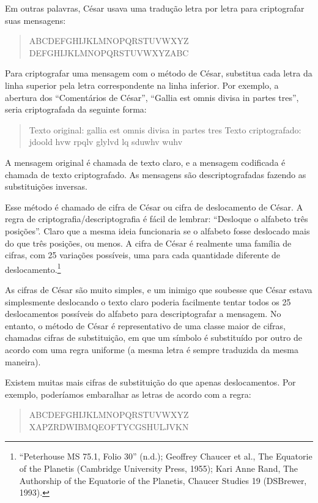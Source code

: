 \documentclass{book}
\begin{document}
Em outras palavras, César usava uma tradução letra por letra para criptografar suas mensagens:

\begin{quote}
    ABCDEFGHIJKLMNOPQRSTUVWXYZ
    DEFGHIJKLMNOPQRSTUVWXYZABC
\end{quote}

Para criptografar uma mensagem com o método de César, substitua cada letra da linha superior pela letra correspondente na linha inferior. Por exemplo, a abertura dos ``Comentários de César'', ``Gallia est omnis divisa in partes tres'', seria criptografada da seguinte forma:

\begin{quote}
    Texto original: gallia est omnis divisa in partes tres
    Texto criptografado: jdoold hvw rpqlv glylvd lq sduwhv wuhv
\end{quote}

A mensagem original é chamada de texto claro, e a mensagem codificada é chamada de texto criptografado. As mensagens são descriptografadas fazendo as substituições inversas.

Esse método é chamado de cifra de César ou cifra de deslocamento de César. A regra de criptografia/descriptografia é fácil de lembrar: ``Desloque o alfabeto três posições''. Claro que a mesma ideia funcionaria se o alfabeto fosse deslocado mais do que três posições, ou menos. A cifra de César é realmente uma família de cifras, com 25 variações possíveis, uma para cada quantidade diferente de deslocamento.\footnote{“Peterhouse MS 75.1, Folio 30” (n.d.); Geoffrey Chaucer et al., The Equatorie of the Planetis (Cambridge University Press, 1955); Kari Anne Rand, The Authorship of the Equatorie of the Planetis, Chaucer Studies 19 (DSBrewer, 1993).}

As cifras de César são muito simples, e um inimigo que soubesse que César estava simplesmente deslocando o texto claro poderia facilmente tentar todos os 25 deslocamentos possíveis do alfabeto para descriptografar a mensagem. No entanto, o método de César é representativo de uma classe maior de cifras, chamadas cifras de substituição, em que um símbolo é substituído por outro de acordo com uma regra uniforme (a mesma letra é sempre traduzida da mesma maneira).

Existem muitas mais cifras de substituição do que apenas deslocamentos. Por exemplo, poderíamos embaralhar as letras de acordo com a regra:

\begin{quote}
    ABCDEFGHIJKLMNOPQRSTUVWXYZ
    XAPZRDWIBMQEOFTYCGSHULJVKN
\end{quote}
\end{document}
